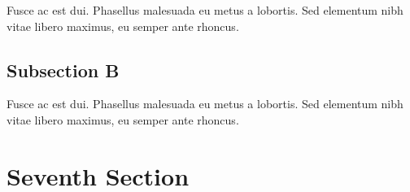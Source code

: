 \par\noindent Fusce ac est dui. Phasellus malesuada eu metus a lobortis. Sed elementum nibh vitae libero maximus, eu semper ante rhoncus.
\par\subsection{Subsection B}
\par\noindent Fusce ac est dui. Phasellus malesuada eu metus a lobortis. Sed elementum nibh vitae libero maximus, eu semper ante rhoncus.
\par\section{Seventh Section}
